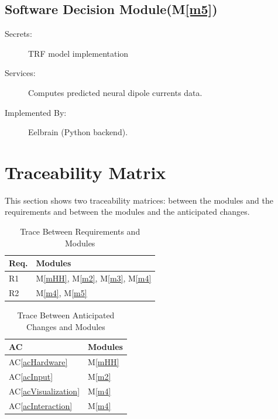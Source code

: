\documentclass[12pt, titlepage]{article}
\newcommand{\acref}[1]{AC\ref{#1}}
\newcommand{\mref}[1]{M\ref{#1}}
\begin{document}
\subsection{Software Decision Module(\mref{m5})}

\begin{description}
\item[Secrets:]  TRF model implementation
\item[Services:] Computes predicted neural dipole currents data.
\item[Implemented By:] Eelbrain (Python backend).
\end{description}


\section{Traceability Matrix} \label{SecTM}

This section shows two traceability matrices: between the modules and the
requirements and between the modules and the anticipated changes.

\begin{table}[H]
\centering
\begin{tabular}{p{} p{}}
\toprule
\textbf{Req.} & \textbf{Modules}\\
\midrule
R1 & \mref{mHH}, \mref{m2}, \mref{m3}, \mref{m4}\\
R2 & \mref{m4}, \mref{m5}\\
\bottomrule
\end{tabular}
\caption{Trace Between Requirements and Modules}
\label{TblRT}
\end{table}

\begin{table}[H]
\centering
\begin{tabular}{p{} p{}}
\toprule
\textbf{AC} & \textbf{Modules}\\
\midrule
\acref{acHardware} & \mref{mHH}\\
\acref{acInput} & \mref{m2}\\
\acref{acVisualization} & \mref{m4}\\
\acref{acInteraction} & \mref{m4}\\
\bottomrule
\end{tabular}
\caption{Trace Between Anticipated Changes and Modules}
\label{TblACT}
\end{table}
\end{document}
